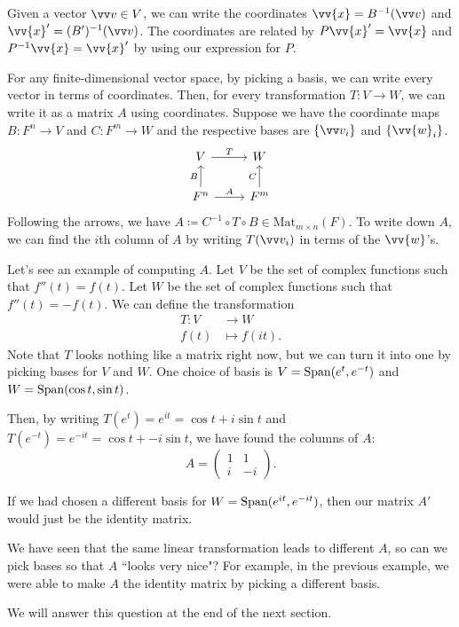 Given a vector $\vvv \in V$, we can write the coordinates $\vv{x} = B^{-1}(\vvv)$ and $\vv{x}' = (B')^{-1} (\vvv)$. The coordinates are related by $P\vv{x}' = \vv{x}$ and $P^{-1}\vv{x} = \vv{x}'$ by using our expression for $P$.

For any finite-dimensional vector space, by picking a basis, we can write every vector in terms of coordinates. 
Then, for every transformation $T: V \rightarrow W$, we can write it as a matrix $A$ using coordinates. 
Suppose we have the coordinate maps $B: F^n \rightarrow V$ and $C : F^m \rightarrow W$ and the respective bases are $\{ \vvv_i\}$ and $\{ \vv{w}_i \}$.
\[
\begin{tikzcd}
V \arrow[r, "T"] & W \\
F^n \arrow[u, "B"]\arrow[r, "A"] & F^m \arrow[u, "C"]
\end{tikzcd}
\]
Following the arrows, we have $A \coloneqq C^{-1} \circ T \circ B \in \text{Mat}_{m\times n}(F)$.
To write down $A$, we can find the $i$th column of $A$ by writing $T(\vvv_i)$ in terms of the $\vv{w}$'s.

\begin{example} 
    Let's see an example of computing $A$.
    Let $V$ be the set of complex functions such that $f''(t) = f(t)$.
    Let $W$ be the set of complex functions such that $f''(t) = -f(t)$. 
    We can define the transformation 
    \begin{align*}
        T:V &\rightarrow W \\
        f(t) &\mapsto f(it) .
    \end{align*}
    Note that $T$ looks nothing like a matrix right now, but we can turn it into one by picking bases for $V$ and $W$. One choice of basis is $V = \text{Span}(e^t, e^{-t})$ and $W = \text{Span}(\cos t, \sin t)$. 

    Then, by writing $T(e^t) = e^{it} = \cos t + i \sin t$ and $T(e^{-t}) = e^{-it} = \cos t + -i \sin t$, we have found the columns of $A$:
    \[A = \begin{pmatrix} 1 & 1 \\ i & -i \end{pmatrix} .\]

    If we had chosen a different basis for $W = \text{Span}(e^{it}, e^{-it})$, then our matrix $A'$ would just be the identity matrix.

\end{example}


\begin{qq}
    We have seen that the same linear transformation leads to different $A$, so can we pick bases so that $A$ ``looks very nice"? For example, in the previous example, we were able to make $A$ the identity matrix by picking a different basis. 
\end{qq}
We will answer this question at the end of the next section.
